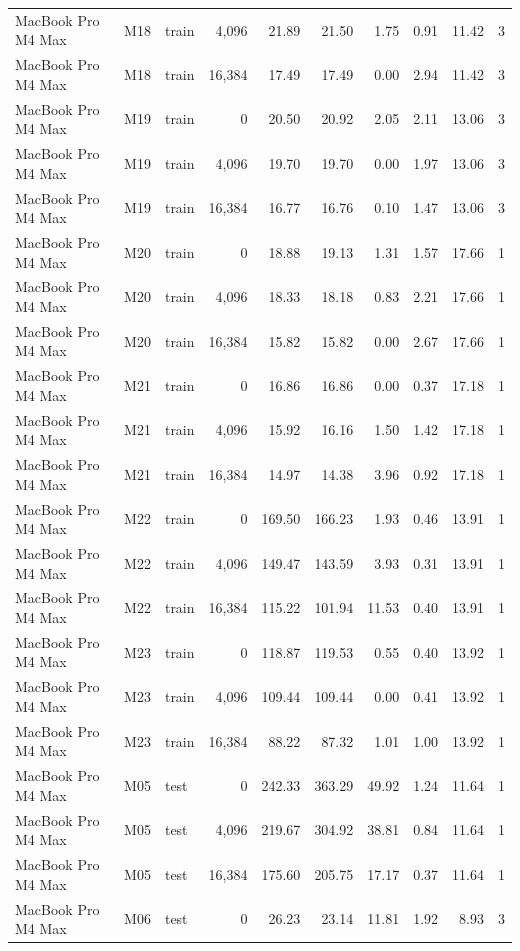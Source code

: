 \documentclass[10pt]{article}
\begin{document}
\begin{landscape}
\begin{longtable}{@{}l l l r r r r r r r@{}}
MacBook Pro M4 Max & M18 & train & 4,096 & 21.89 & 21.50 & 1.75 & 0.91 & 11.42 & 3 \\
MacBook Pro M4 Max & M18 & train & 16,384 & 17.49 & 17.49 & 0.00 & 2.94 & 11.42 & 3 \\
MacBook Pro M4 Max & M19 & train & 0 & 20.50 & 20.92 & 2.05 & 2.11 & 13.06 & 3 \\
MacBook Pro M4 Max & M19 & train & 4,096 & 19.70 & 19.70 & 0.00 & 1.97 & 13.06 & 3 \\
MacBook Pro M4 Max & M19 & train & 16,384 & 16.77 & 16.76 & 0.10 & 1.47 & 13.06 & 3 \\
MacBook Pro M4 Max & M20 & train & 0 & 18.88 & 19.13 & 1.31 & 1.57 & 17.66 & 1 \\
MacBook Pro M4 Max & M20 & train & 4,096 & 18.33 & 18.18 & 0.83 & 2.21 & 17.66 & 1 \\
MacBook Pro M4 Max & M20 & train & 16,384 & 15.82 & 15.82 & 0.00 & 2.67 & 17.66 & 1 \\
MacBook Pro M4 Max & M21 & train & 0 & 16.86 & 16.86 & 0.00 & 0.37 & 17.18 & 1 \\
MacBook Pro M4 Max & M21 & train & 4,096 & 15.92 & 16.16 & 1.50 & 1.42 & 17.18 & 1 \\
MacBook Pro M4 Max & M21 & train & 16,384 & 14.97 & 14.38 & 3.96 & 0.92 & 17.18 & 1 \\
MacBook Pro M4 Max & M22 & train & 0 & 169.50 & 166.23 & 1.93 & 0.46 & 13.91 & 1 \\
MacBook Pro M4 Max & M22 & train & 4,096 & 149.47 & 143.59 & 3.93 & 0.31 & 13.91 & 1 \\
MacBook Pro M4 Max & M22 & train & 16,384 & 115.22 & 101.94 & 11.53 & 0.40 & 13.91 & 1 \\
MacBook Pro M4 Max & M23 & train & 0 & 118.87 & 119.53 & 0.55 & 0.40 & 13.92 & 1 \\
MacBook Pro M4 Max & M23 & train & 4,096 & 109.44 & 109.44 & 0.00 & 0.41 & 13.92 & 1 \\
MacBook Pro M4 Max & M23 & train & 16,384 & 88.22 & 87.32 & 1.01 & 1.00 & 13.92 & 1 \\
MacBook Pro M4 Max & M05 & test & 0 & 242.33 & 363.29 & 49.92 & 1.24 & 11.64 & 1 \\
MacBook Pro M4 Max & M05 & test & 4,096 & 219.67 & 304.92 & 38.81 & 0.84 & 11.64 & 1 \\
MacBook Pro M4 Max & M05 & test & 16,384 & 175.60 & 205.75 & 17.17 & 0.37 & 11.64 & 1 \\
MacBook Pro M4 Max & M06 & test & 0 & 26.23 & 23.14 & 11.81 & 1.92 & 8.93 & 3 \\

\end{longtable}
\end{landscape}
\end{document}
